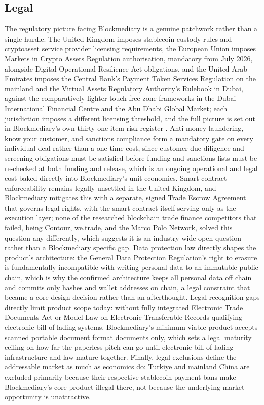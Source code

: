 \documentclass[12pt, a4paper]{article}
\begin{document}
\subsection*{Legal}

The regulatory picture facing Blockmediary is a genuine patchwork rather than a single
hurdle. The United Kingdom imposes stablecoin custody rules and cryptoasset service
provider licensing requirements, the European Union imposes Markets in Crypto Assets
Regulation authorisation, mandatory from July 2026, alongside Digital Operational
Resilience Act obligations, and the United Arab Emirates imposes the Central Bank's
Payment Token Services Regulation on the mainland and the Virtual Assets Regulatory
Authority's Rulebook in Dubai, against the comparatively lighter touch free zone
frameworks in the Dubai International Financial Centre and the Abu Dhabi Global Market;
each jurisdiction imposes a different licensing threshold, and the full picture is set out
in Blockmediary's own thirty one item risk register \citep{internallegalrisk2026}. Anti
money laundering, know your customer, and sanctions compliance form a mandatory gate on
every individual deal rather than a one time cost, since customer due diligence and
screening obligations must be satisfied before funding and sanctions lists must be
re-checked at both funding and release, which is an ongoing operational and legal cost
baked directly into Blockmediary's unit economics. Smart contract enforceability remains
legally unsettled in the United Kingdom, and Blockmediary mitigates this with a separate,
signed Trade Escrow Agreement that governs legal rights, with the smart contract itself
serving only as the execution layer; none of the researched blockchain trade finance
competitors that failed, being Contour, we.trade, and the Marco Polo Network, solved this
question any differently, which suggests it is an industry wide open question rather than
a Blockmediary specific gap. Data protection law directly shapes the product's
architecture: the General Data Protection Regulation's right to erasure is fundamentally
incompatible with writing personal data to an immutable public chain, which is why the
confirmed architecture keeps all personal data off chain and commits only hashes and
wallet addresses on chain, a legal constraint that became a core design decision rather
than an afterthought. Legal recognition gaps directly limit product scope today: without
fully integrated Electronic Trade Documents Act or Model Law on Electronic Transferable
Records qualifying electronic bill of lading systems, Blockmediary's minimum viable product
accepts scanned portable document format documents only, which sets a legal maturity
ceiling on how far the paperless pitch can go until electronic bill of lading
infrastructure and law mature together. Finally, legal exclusions define the addressable
market as much as economics do: Turkiye and mainland China are excluded primarily because
their respective stablecoin payment bans make Blockmediary's core product illegal there,
not because the underlying market opportunity is unattractive.
\end{document}
